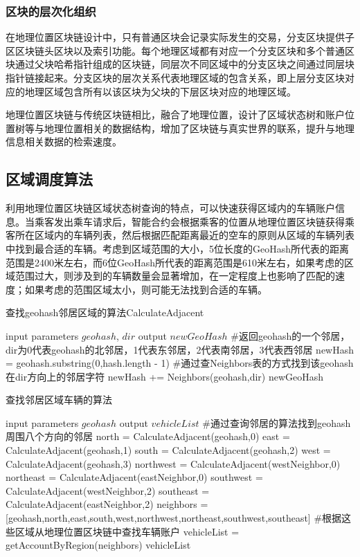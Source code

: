 \subsubsection{区块的层次化组织}
在地理位置区块链设计中，只有普通区块会记录实际发生的交易，分支区块提供子区区块链头区块以及索引功能。每个地理区域都有对应一个分支区块和多个普通区块通过父块哈希指针组成的区块链，同层次不同区域中的分支区块之间通过同层块指针链接起来。分支区块的层次关系代表地理区域的包含关系，即上层分支区块对应的地理区域包含所有以该区块为父块的下层区块对应的地理区域。

地理位置区块链与传统区块链相比，融合了地理位置，设计了区域状态树和账户位置树等与地理位置相关的数据结构，增加了区块链与真实世界的联系，提升与地理信息相关数据的检索速度。

\subsection{区域调度算法}

利用地理位置区块链区域状态树查询的特点，可以快速获得区域内的车辆账户信息。当乘客发出乘车请求后，智能合约会根据乘客的位置从地理位置区块链获得乘客所在区域内的车辆列表，然后根据匹配距离最近的空车的原则从区域的车辆列表中找到最合适的车辆。考虑到区域范围的大小，5位长度的GeoHash所代表的距离范围是2400米左右，而6位GeoHash所代表的距离范围是610米左右，如果考虑的区域范围过大，则涉及到的车辆数量会显著增加，在一定程度上也影响了匹配的速度；如果考虑的范围区域太小，则可能无法找到合适的车辆。

\begin{algorithm}[h]
  \caption{查找geohash邻居区域的算法CalculateAdjacent}
  \label{alg:findNeighbor}
  \begin{algorithmic}[1]
    \REQUIRE input parameters $geohash$, $dir$
    \ENSURE output $newGeoHash$
    \STATE \#返回geohash的一个邻居，dir为0代表geohash的北邻居，1代表东邻居，2代表南邻居，3代表西邻居
    \STATE newHash = geohash.substring(0,hash.length - 1)
    \STATE \#通过查Neighbors表的方式找到该geohash在dir方向上的邻居字符
    \STATE newHash += Neighbors(geohash,dir)
    \RETURN newGeoHash
    \end{algorithmic}
\end{algorithm}

\begin{algorithm}[h]
  \caption{查找邻居区域车辆的算法}
  \label{alg:findNeighborVehicles}
  \begin{algorithmic}[1]
  \REQUIRE input parameters $geohash$
  \ENSURE output $vehicleList$
  \STATE \#通过查询邻居的算法找到geohash周围八个方向的邻居
  \STATE north = CalculateAdjacent(geohash,0)
  \STATE east = CalculateAdjacent(geohash,1)
  \STATE south = CalculateAdjacent(geohash,2)
  \STATE west = CalculateAdjacent(geohash,3)
  \STATE northwest = CalculateAdjacent(westNeighbor,0)
  \STATE northeast = CalculateAdjacent(eastNeighbor,0)
  \STATE southwest = CalculateAdjacent(westNeighbor,2)
  \STATE southeast = CalculateAdjacent(eastNeighbor,2)
  \STATE neighbors = [geohash,north,east,south,west,northwest,northeast,southwest,southeast]
  \STATE \#根据这些区域从地理位置区块链中查找车辆账户
  \STATE vehicleList = getAccountByRegion(neighbors)
  \RETURN vehicleList
  \end{algorithmic}
\end{algorithm}

